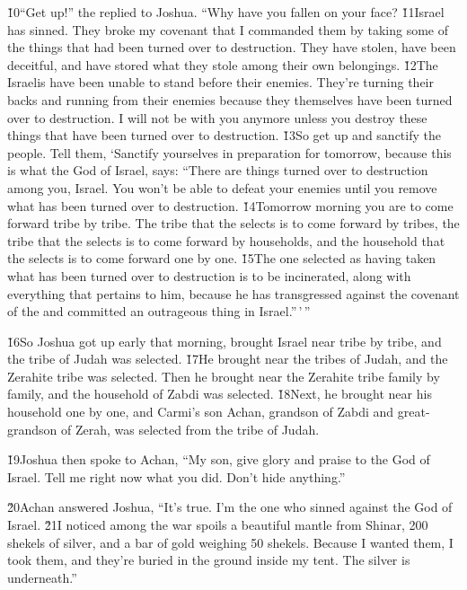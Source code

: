 \v{10}``Get up!'' the  replied to Joshua. ``Why have you fallen on your face? \v{11}Israel has sinned. They broke my covenant that I commanded them by taking some of the things that had been turned over to destruction. They have stolen, have been deceitful, and have stored what they stole among their own belongings. \v{12}The Israelis have been unable to stand before their enemies. They're turning their backs and running from their enemies because they themselves have been turned over to destruction. I will not be with you anymore unless you destroy these things that have been turned over to destruction. \v{13}So get up and sanctify the people. Tell them, `Sanctify yourselves in preparation for tomorrow, because this is what the  God of Israel, says: ``There are things turned over to destruction among you, Israel. You won't be able to defeat your enemies until you remove what has been turned over to destruction. \v{14}Tomorrow morning you are to come forward tribe by tribe. The tribe that the  selects is to come forward by tribes, the tribe that the  selects is to come forward by households, and the household that the  selects is to come forward one by one. \v{15}The one selected as having taken what has been turned over to destruction is to be incinerated, along with everything that pertains to him, because he has transgressed against the covenant of the  and committed an outrageous thing in Israel.''\,'\,''

\v{16}So Joshua got up early that morning, brought Israel near tribe by tribe, and the tribe of Judah was selected. \v{17}He brought near the tribes of Judah, and the Zerahite tribe was selected. Then he brought near the Zerahite tribe family by family, and the household of Zabdi was selected. \v{18}Next, he brought near his household one by one, and Carmi's son Achan, grandson of Zabdi and great-grandson of Zerah, was selected from the tribe of Judah.

\v{19}Joshua then spoke to Achan, ``My son, give glory and praise to the  God of Israel. Tell me right now what you did. Don't hide anything.''

\v{20}Achan answered Joshua, ``It's true. I'm the one who sinned against the  God of Israel. \v{21}I noticed among the war spoils a beautiful mantle from Shinar, 200 shekels of silver, and a bar of gold weighing 50 shekels. Because I wanted them, I took them, and they're buried in the ground inside my tent. The silver is underneath.''

